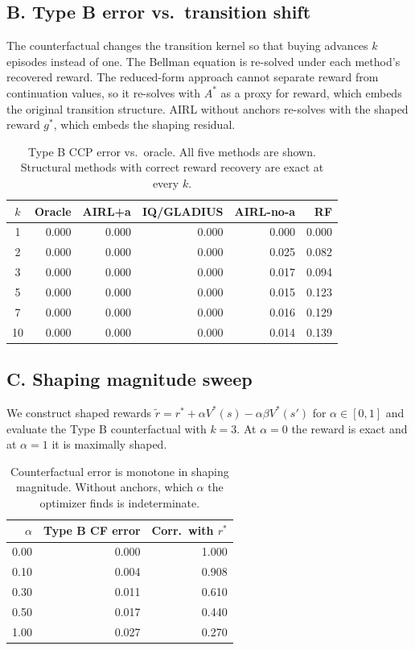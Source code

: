 \documentclass[11pt]{article}
\begin{document}
\subsection{B. Type B error vs.\ transition shift}

The counterfactual changes the transition kernel so that buying advances $k$ episodes instead of one. The Bellman equation is re-solved under each method's recovered reward. The reduced-form approach cannot separate reward from continuation values, so it re-solves with $A^*$ as a proxy for reward, which embeds the original transition structure. AIRL without anchors re-solves with the shaped reward $g^*$, which embeds the shaping residual.

\begin{table}[H]
\centering
\begin{tabular}{crrrrr}
\toprule
$k$ & Oracle & AIRL+a & IQ/GLADIUS & AIRL-no-a & RF \\
\midrule
1  & 0.000 & 0.000 & 0.000 & 0.000 & 0.000 \\
2  & 0.000 & 0.000 & 0.000 & 0.025 & 0.082 \\
3  & 0.000 & 0.000 & 0.000 & 0.017 & 0.094 \\
5  & 0.000 & 0.000 & 0.000 & 0.015 & 0.123 \\
7  & 0.000 & 0.000 & 0.000 & 0.016 & 0.129 \\
10 & 0.000 & 0.000 & 0.000 & 0.014 & 0.139 \\
\bottomrule
\end{tabular}
\caption{Type B CCP error vs.\ oracle. All five methods are shown. Structural methods with correct reward recovery are exact at every $k$.}
\label{tab:type2}
\end{table}

\subsection{C. Shaping magnitude sweep}

We construct shaped rewards $\tilde{r} = r^* + \alpha V^*(s) - \alpha\beta V^*(s')$ for $\alpha \in [0,1]$ and evaluate the Type B counterfactual with $k=3$. At $\alpha = 0$ the reward is exact and at $\alpha = 1$ it is maximally shaped.

\begin{table}[H]
\centering
\begin{tabular}{rrr}
\toprule
$\alpha$ & Type B CF error & Corr.\ with $r^*$ \\
\midrule
0.00 & 0.000 & 1.000 \\
0.10 & 0.004 & 0.908 \\
0.30 & 0.011 & 0.610 \\
0.50 & 0.017 & 0.440 \\
1.00 & 0.027 & 0.270 \\
\bottomrule
\end{tabular}
\caption{Counterfactual error is monotone in shaping magnitude. Without anchors, which $\alpha$ the optimizer finds is indeterminate.}
\label{tab:shaping}
\end{table}
\end{document}
